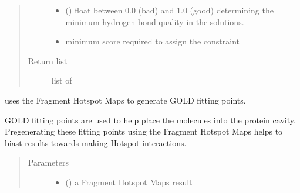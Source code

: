 \documentclass[letterpaper,10pt,english]{sphinxmanual}
\begin{document}
\begin{fulllineitems}
\begin{fulllineitems}
\begin{fulllineitems}
\begin{quote}
\begin{description}
\begin{itemize}
\item {} 
 () \textendash{} float between 0.0 (bad) and 1.0 (good) determining the minimum hydrogen bond quality in the solutions.

\item {} 
 \textendash{} minimum score required to assign the constraint

\end{itemize}

\item[{Return list}] \leavevmode
list of 

\end{description}\end{quote}

\end{fulllineitems}


\end{fulllineitems}


\begin{fulllineitems}
\label{\detokenize{hs_docking_api:hotspots.hs_docking.DockerSettings.generate_fitting_points}}
uses the Fragment Hotspot Maps to generate GOLD fitting points.

GOLD fitting points are used to help place the molecules into the protein cavity. Pre\sphinxhyphen{}generating these fitting
points using the Fragment Hotspot Maps helps to biast results towards making Hotspot interactions.
\begin{quote}\begin{description}
\item[{Parameters}] \leavevmode\begin{itemize}
\item {} 
 () \textendash{} a Fragment Hotspot Maps result


\end{itemize}
\end{description}
\end{quote}
\end{fulllineitems}
\end{fulllineitems}
\end{document}
